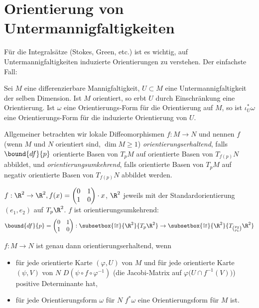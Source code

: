\section*{Orientierung von Untermannigfaltigkeiten}\lecture

Für die Integralsätze (Stokes, Green, etc.) ist es wichtig, auf Untermannigfaltigkeiten induzierte Orientierungen zu verstehen. Der einfachste Fall:

\begin{lem}
	Sei $M$ eine differenzierbare Mannigfaltigkeit, $U \subset M$ eine Untermannigfaltigkeit der selben Dimension. Ist $M$ orientiert, so erbt $U$ durch Einschränkung eine Orientierung. Ist $\omega$ eine Orientierungs-Form für die Orientierung auf $M$, so ist \( \iota_U^*\omega \) eine Orientierungs-Form für die induzierte Orientierung von $U$.
\end{lem}

Allgemeiner betrachten wir lokale Diffeomorphismen \( f: M \to N \) und nennen $f$ (wenn $M$ und $N$ orientiert sind, $\dim M \geq 1$) \emph{orientierungserhaltend}, falls \( \bound{df}{p} \) orientierte Basen von $T_pM$ auf orientierte Basen von \( T_{f(p)}N \) abbildet, und \emph{orientierungsumkehrend}, falls orientierte Basen von $T_pM$ auf negativ orientierte Basen von \( T_{f(p)}N \) abbildet werden.

\begin{exmp*}
	\( f: \R^2 \to \R^2, f(x) = \begin{pmatrix}
		0&1\\1&0	\end{pmatrix} \cdot x \), $\R^2$ jeweils mit der Standardorientierung $(e_1,e_2)$ auf \( T_p\R^2 \). $f$ ist orientierungsumkehrend:
	\[ \bound{df}{p} = \begin{pmatrix}
		0&1\\1&0	\end{pmatrix}:
		\subsetbox{\cong}{\R^2}{T_p\R^2} \to \subsetbox{\cong}{\R^2}{T_{\binom{p_2}{p_1}}\R^2} \]
\end{exmp*}

\begin{rem}
	\( f:M \to N \) ist genau dann orientierungserhaltend, wenn 
	\begin{itemize}
		\item für jede orientierte Karte \( (\varphi,U) \) von $M$ und für jede orientierte Karte \( (\psi,V) \) von $N$ \( D(\psi \circ f \circ \varphi^{-1}) \) \big(die Jacobi-Matrix auf \( \varphi\big(U \cap f^{-1}(V)\big) \)\big) positive Determinante hat,
		\item für jede Orientierungsform $\omega$ für $N$ $f^*\omega$ eine Orientierungsform für $M$ ist.
	\end{itemize}
\end{rem}

